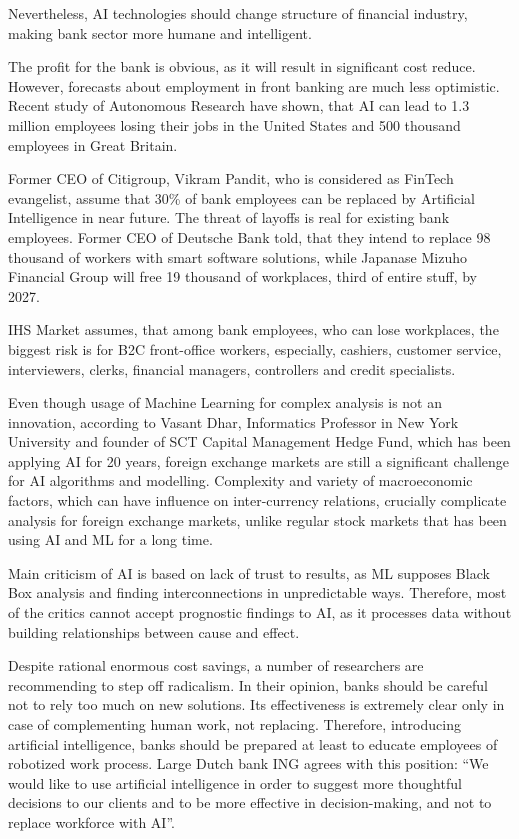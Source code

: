 Nevertheless, AI technologies should change structure of financial industry, making bank sector more humane and intelligent.


The profit for the bank is obvious, as it will result in significant cost reduce.
However, forecasts about employment in front banking are much less optimistic.
Recent study of Autonomous Research have shown, that AI can lead to 1.3 million employees losing their jobs in the United States and 500 thousand employees in Great Britain.

Former CEO of Citigroup, Vikram Pandit, who is considered as FinTech evangelist, assume that 30\% of bank employees can be replaced by Artificial Intelligence in near future. 
The threat of layoffs is real for existing bank employees.
Former CEO of Deutsche Bank told, that they intend to replace 98 thousand of workers with smart software solutions, while
Japanase Mizuho Financial Group will free 19 thousand of workplaces, third of entire stuff, by 2027. 
\cite{ai_reality_hype}


IHS Market assumes, that among bank employees, who can lose workplaces, the biggest risk is for B2C front-office workers, especially, cashiers, customer service, interviewers, clerks, financial managers, controllers and credit specialists.
\cite{ihs_markit}


Even though usage of Machine Learning for complex analysis is not an innovation, according to Vasant Dhar, Informatics Professor in New York University and founder of SCT Capital Management Hedge Fund, which has been applying AI for 20 years, foreign exchange markets are still a significant challenge for AI algorithms and modelling.
Complexity and variety of macroeconomic factors, which can have influence on inter-currency relations, crucially complicate analysis for foreign exchange markets, unlike regular stock markets that has been using AI and ML for a long time.

Main criticism of AI is based on lack of trust to results, as ML supposes Black Box analysis and finding interconnections in unpredictable ways. 
Therefore, most of the critics cannot accept prognostic findings to AI, as it processes data without building relationships
between cause and effect.

Despite rational enormous cost savings, a number of researchers are recommending to step off radicalism.
In their opinion, banks should be careful not to rely too much on new solutions.
Its effectiveness is extremely clear only in case of complementing human work, not replacing.
Therefore, introducing artificial intelligence, banks should be prepared at least to educate employees of robotized work process.
Large Dutch bank ING agrees with this position:
“We would like to use artificial intelligence in order to suggest more thoughtful decisions to our clients and to be more effective in decision-making, and not to replace workforce with AI”.
\cite{ai_reality_hype}


